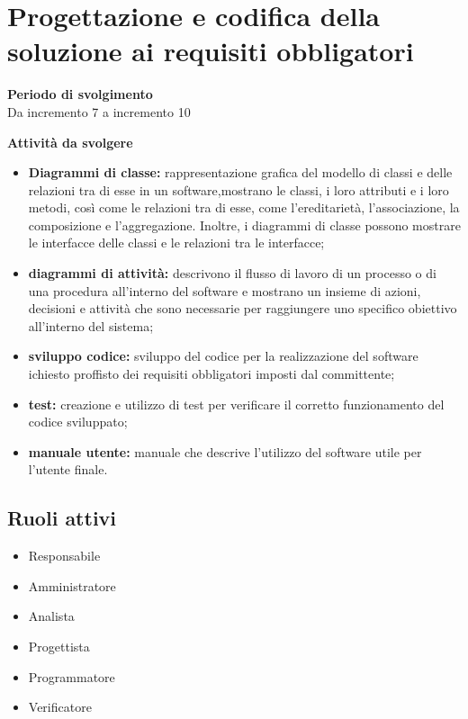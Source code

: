 \section{Progettazione e codifica della soluzione ai requisiti obbligatori}

\textbf{Periodo di svolgimento}
\\ Da incremento 7 a incremento 10

\textbf{Attività da svolgere}
    \begin{itemize}
        \item \textbf{Diagrammi di classe:} rappresentazione grafica del modello di classi e delle relazioni tra di esse in un software,mostrano le classi, i loro attributi e i loro metodi, così come le relazioni tra di esse, come l'ereditarietà, l'associazione, la composizione e l'aggregazione. Inoltre, i diagrammi di classe possono mostrare le interfacce delle classi e le relazioni tra le interfacce; 
        \item \textbf{diagrammi di attività:} descrivono il flusso di lavoro di un processo o di una procedura all'interno del software e mostrano un insieme di azioni, decisioni e attività che sono necessarie per raggiungere uno specifico obiettivo all'interno del sistema;
        \item \textbf{sviluppo codice:} sviluppo del codice per la realizzazione del software ichiesto proffisto dei requisiti obbligatori imposti dal committente;
        \item \textbf{test:} creazione e utilizzo di test per verificare il corretto funzionamento del codice sviluppato;
        \item \textbf{manuale utente:} manuale che descrive l'utilizzo del software utile per l'utente finale.
    \end{itemize}

\subsection{Ruoli attivi}
\begin{itemize}
    \item Responsabile 
    \item Amministratore
    \item Analista
    \item Progettista 
    \item Programmatore 
    \item Verificatore 
\end{itemize}

